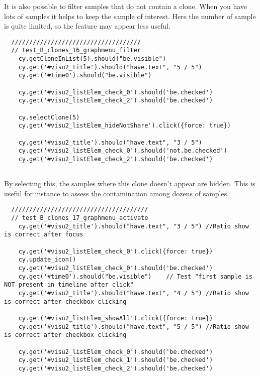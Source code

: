 
It is also possible to filter samples that do not contain a clone.  When you
have lots of samples it helps to keep the sample of interest.  Here the number
of sample is quite limited, so the feature may appear less useful.

\begin{verbatim}
  ////////////////////////////////////
  // test_B_clones_16_graphmenu_filter
    cy.getCloneInList(5).should("be.visible")
    cy.get('#visu2_title').should("have.text", "5 / 5")
    cy.get('#time0').should("be.visible")

    cy.get('#visu2_listElem_check_0').should('be.checked')
    cy.get('#visu2_listElem_check_2').should('be.checked')

    cy.selectClone(5)
    cy.get('#visu2_listElem_hideNotShare').click({force: true})

    cy.get('#visu2_title').should("have.text", "3 / 5")
    cy.get('#visu2_listElem_check_0').should('not.be.checked')
    cy.get('#visu2_listElem_check_2').should('be.checked')


\end{verbatim}

By selecting this, the samples where this clone doesn't appear are hidden.
This is useful for instance to assess the contamination among dozens of
samples.

\begin{verbatim}
  //////////////////////////////////////
  // test_B_clones_17_graphmenu_activate
    cy.get('#visu2_title').should("have.text", "3 / 5") //Ratio show is correct after focus

    cy.get('#visu2_listElem_check_0').click({force: true})
    cy.update_icon()
    cy.get('#visu2_listElem_check_0').should('be.checked')
    cy.get('#time0').should("be.visible")    // Test "first sample is NOT present in timeline after click"
    cy.get('#visu2_title').should("have.text", "4 / 5") //Ratio show is correct after checkbox clicking

    cy.get('#visu2_listElem_showAll').click({force: true})
    cy.get('#visu2_title').should("have.text", "5 / 5") //Ratio show is correct after checkbox clicking

    cy.get('#visu2_listElem_check_0').should('be.checked')
    cy.get('#visu2_listElem_check_1').should('be.checked')
    cy.get('#visu2_listElem_check_2').should('be.checked')


\end{verbatim}

